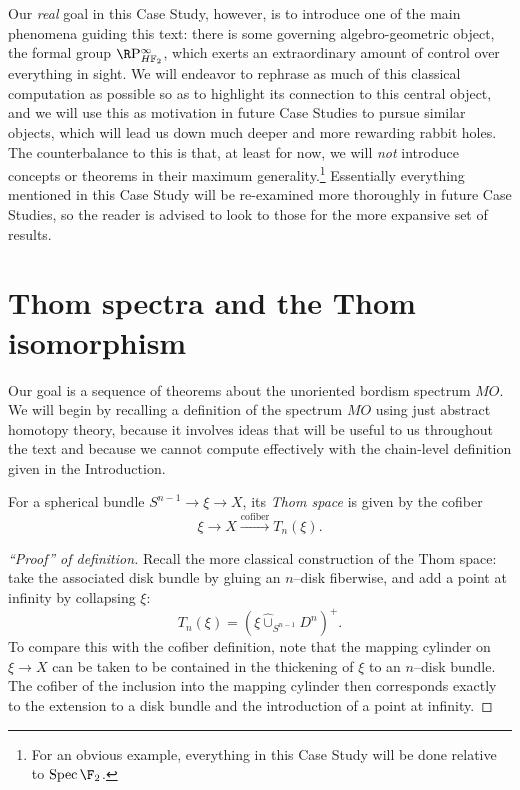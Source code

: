 Our \emph{real} goal in this Case Study, however, is to introduce one of the main phenomena guiding this text: there is some governing algebro-geometric object, the formal group \(\RP^\infty_{\HFtwo}\), which exerts an extraordinary amount of control over everything in sight.  We will endeavor to rephrase as much of this classical computation as possible so as to highlight its connection to this central object, and we will use this as motivation in future Case Studies to pursue similar objects, which will lead us down much deeper and more rewarding rabbit holes.  The counterbalance to this is that, at least for now, we will \emph{\emph{not}} introduce concepts or theorems in their maximum generality.\footnote{For an obvious example, everything in this Case Study will be done relative to \(\Spec \F_2\).}  Essentially everything mentioned in this Case Study will be re-examined more thoroughly in future Case Studies, so the reader is advised to look to those for the more expansive set of results.






\section{Thom spectra and the Thom isomorphism}\label{LectureThomSpectra}

Our goal is a sequence of theorems about the unoriented bordism spectrum \(MO\).  We will begin by recalling a definition of the spectrum \(MO\) using just abstract homotopy theory, because it involves ideas that will be useful to us throughout the text and because we cannot compute effectively with the chain-level definition given in the Introduction.

\begin{definition}
For a spherical bundle \(S^{n-1} \to \xi \to X\), its \textit{Thom space} is given by the cofiber \[\xi \to X \xrightarrow{\text{cofiber}} T_n(\xi).\]
\end{definition}
\begin{proof}[``Proof'' of definition]
Recall the more classical construction of the Thom space: take the associated disk bundle by gluing an \(n\)--disk fiberwise, and add a point at infinity by collapsing \(\xi\): \[T_n(\xi) = (\xi \widehat\cup_{S^{n-1}} D^n)^+.\]  To compare this with the cofiber definition, note that the mapping cylinder on \(\xi \to X\) can be taken to be contained in the thickening of \(\xi\) to an \(n\)--disk bundle.  The cofiber of the inclusion into the mapping cylinder then corresponds exactly to the extension to a disk bundle and the introduction of a point at infinity.
\end{proof}

